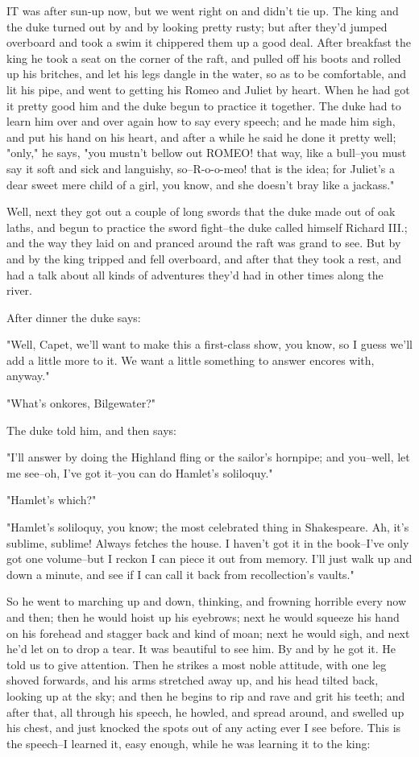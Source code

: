 IT was after sun-up now, but we went right on and didn't tie up.  The
king and the duke turned out by and by looking pretty rusty; but after
they'd jumped overboard and took a swim it chippered them up a good deal.
After breakfast the king he took a seat on the corner of the raft, and
pulled off his boots and rolled up his britches, and let his legs dangle
in the water, so as to be comfortable, and lit his pipe, and went to
getting his Romeo and Juliet by heart.  When he had got it pretty good
him and the duke begun to practice it together.  The duke had to learn
him over and over again how to say every speech; and he made him sigh,
and put his hand on his heart, and after a while he said he done it
pretty well; "only," he says, "you mustn't bellow out ROMEO! that way,
like a bull--you must say it soft and sick and languishy, so--R-o-o-meo!
that is the idea; for Juliet's a dear sweet mere child of a girl, you
know, and she doesn't bray like a jackass."

Well, next they got out a couple of long swords that the duke made out of
oak laths, and begun to practice the sword fight--the duke called himself
Richard III.; and the way they laid on and pranced around the raft was
grand to see.  But by and by the king tripped and fell overboard, and
after that they took a rest, and had a talk about all kinds of adventures
they'd had in other times along the river.

After dinner the duke says:

"Well, Capet, we'll want to make this a first-class show, you know, so I
guess we'll add a little more to it.  We want a little something to
answer encores with, anyway."

"What's onkores, Bilgewater?"

The duke told him, and then says:

"I'll answer by doing the Highland fling or the sailor's hornpipe; and
you--well, let me see--oh, I've got it--you can do Hamlet's soliloquy."

"Hamlet's which?"

"Hamlet's soliloquy, you know; the most celebrated thing in Shakespeare.
Ah, it's sublime, sublime!  Always fetches the house.  I haven't got it
in the book--I've only got one volume--but I reckon I can piece it out
from memory.  I'll just walk up and down a minute, and see if I can call
it back from recollection's vaults."

So he went to marching up and down, thinking, and frowning horrible every
now and then; then he would hoist up his eyebrows; next he would squeeze
his hand on his forehead and stagger back and kind of moan; next he would
sigh, and next he'd let on to drop a tear.  It was beautiful to see him.
By and by he got it.  He told us to give attention.  Then he strikes a
most noble attitude, with one leg shoved forwards, and his arms stretched
away up, and his head tilted back, looking up at the sky; and then he
begins to rip and rave and grit his teeth; and after that, all through
his speech, he howled, and spread around, and swelled up his chest, and
just knocked the spots out of any acting ever I see before.  This is the
speech--I learned it, easy enough, while he was learning it to the king:

